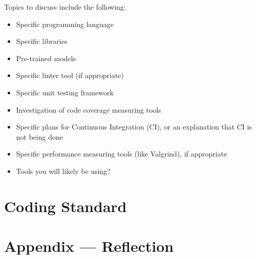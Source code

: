 \documentclass{article}
\begin{document}
Topics to discuss include the following:

\begin{itemize}
\item Specific programming language
\item Specific libraries
\item Pre-trained models
\item Specific linter tool (if appropriate)
\item Specific unit testing framework
\item Investigation of code coverage measuring tools
\item Specific plans for Continuous Integration (CI), or an explanation that CI
  is not being done
\item Specific performance measuring tools (like Valgrind), if
  appropriate
\item Tools you will likely be using?
\end{itemize}


\section{Coding Standard}


\newpage{}

\section*{Appendix --- Reflection}



\end{document}
